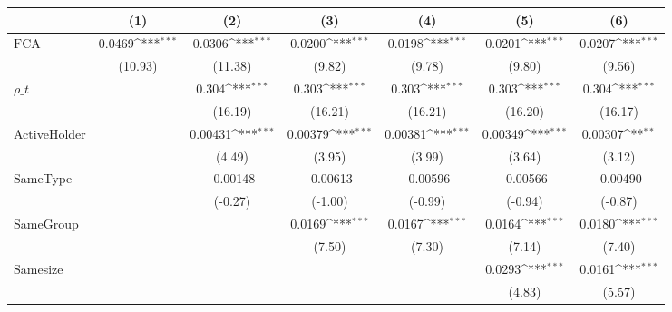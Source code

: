 {
\def\sym#1{\ifmmode^{#1}\else\(^{#1}\)\fi}
\begin{tabular}{l*{6}{c}}
\hline\hline
                    &\multicolumn{1}{c}{(1)}         &\multicolumn{1}{c}{(2)}         &\multicolumn{1}{c}{(3)}         &\multicolumn{1}{c}{(4)}         &\multicolumn{1}{c}{(5)}         &\multicolumn{1}{c}{(6)}         \\
\hline
$ \text{FCA} $      &      0.0469\sym{***}&      0.0306\sym{***}&      0.0200\sym{***}&      0.0198\sym{***}&      0.0201\sym{***}&      0.0207\sym{***}\\
                    &     (10.93)         &     (11.38)         &      (9.82)         &      (9.78)         &      (9.80)         &      (9.56)         \\
[1em]
$ \rho\_t $          &                     &       0.304\sym{***}&       0.303\sym{***}&       0.303\sym{***}&       0.303\sym{***}&       0.304\sym{***}\\
                    &                     &     (16.19)         &     (16.21)         &     (16.21)         &     (16.20)         &     (16.17)         \\
[1em]
ActiveHolder        &                     &     0.00431\sym{***}&     0.00379\sym{***}&     0.00381\sym{***}&     0.00349\sym{***}&     0.00307\sym{**} \\
                    &                     &      (4.49)         &      (3.95)         &      (3.99)         &      (3.64)         &      (3.12)         \\
[1em]
SameType            &                     &    -0.00148         &    -0.00613         &    -0.00596         &    -0.00566         &    -0.00490         \\
                    &                     &     (-0.27)         &     (-1.00)         &     (-0.99)         &     (-0.94)         &     (-0.87)         \\
[1em]
SameGroup           &                     &                     &      0.0169\sym{***}&      0.0167\sym{***}&      0.0164\sym{***}&      0.0180\sym{***}\\
                    &                     &                     &      (7.50)         &      (7.30)         &      (7.14)         &      (7.40)         \\
[1em]
Samesize            &                     &                     &                     &                     &      0.0293\sym{***}&      0.0161\sym{***}\\
                    &                     &                     &                     &                     &      (4.83)         &      (5.57)         \\

\end{tabular}}
